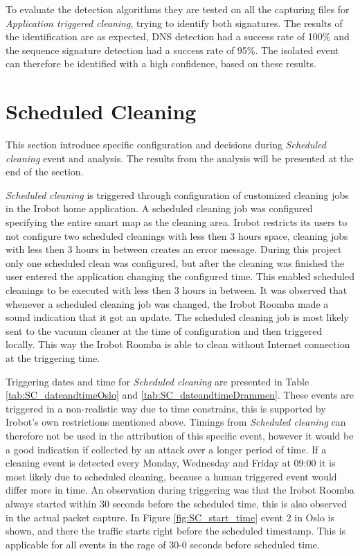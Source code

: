 To evaluate the detection algorithms they are tested on all the capturing files for \textit{Application triggered cleaning}, trying to identify both signatures. The results of the identification are as expected,  DNS detection had a success rate of 100\% and the sequence signature detection had a success rate of 95\%. The isolated event can therefore be identified with a high confidence, based on these results. 

\section{Scheduled Cleaning}
This section introduce specific configuration and decisions during \textit{Scheduled cleaning} event and analysis. The results from the analysis will be presented at the end of the section.

\textit{Scheduled cleaning} is triggered through configuration of customized cleaning jobs in the Irobot home application. A scheduled cleaning job was configured specifying the entire smart map as the cleaning area. Irobot restricts its users to not configure two scheduled cleanings with less then 3 hours space, cleaning jobs with less then 3 hours in between creates an error message. During this project only one scheduled clean was configured, but after the cleaning was finished the user entered the application changing the configured time. This enabled scheduled cleanings to be executed with less then 3 hours in between. It was observed that whenever a scheduled cleaning job was changed, the Irobot Roomba made a sound indication that it got an update. The scheduled cleaning job is most likely sent to the vacuum cleaner at the time of configuration and then triggered locally. This way the Irobot Roomba is able to clean without Internet connection at the triggering time. 

Triggering dates and time for \textit{Scheduled cleaning} are presented in Table \ref{tab:SC_dateandtimeOslo} and \ref{tab:SC_dateandtimeDrammen}. These events are triggered in a non-realistic way due to time constrains, this is supported by Irobot's own restrictions mentioned above. Timings from \textit{Scheduled cleaning} can therefore not be used in the attribution of this specific event, however it would be a good indication if collected by an attack over a longer period of time. If a cleaning event is detected every Monday, Wednesday and Friday at 09:00 it is most likely due to scheduled cleaning, because a human triggered event would differ more in time. An observation during triggering was that the Irobot Roomba always started within 30 seconds before the scheduled time, this is also observed in the actual packet capture. In Figure \ref{fig:SC_start_time} event 2 in Oslo is shown, and there the traffic starts right before the scheduled timestamp. This is applicable for all events in the rage of 30-0 seconds before scheduled time. 

